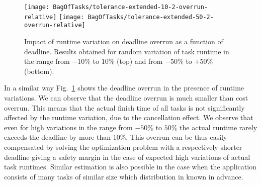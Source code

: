 {  \begin{figure}[tb]
     \centering
     \texttt{[image: BagOfTasks/tolerance-extended-10-2-overrun-relative]}  
     \texttt{[image: BagOfTasks/tolerance-extended-50-2-overrun-relative]}  
 	   \caption{Impact of runtime variation on deadline overrun as a function of deadline. 
 	   Results obtained for random variation of task runtime in the range from $ -10\%$ to $10\%$ (top)
 	   and from $-50\%$ to $+50\%$ (bottom). }
 	   \label{fig:dynamic-time}
  \end{figure} 

  In a similar way Fig.~\ref{fig:dynamic-time} shows the deadline overrun in
  the presence of runtime variations. We can observe that the deadline overrun
  is much smaller than cost overrun. This means that the actual finish time of
  all tasks is not significantly affected by the runtime variation, due to the
  cancellation effect. We observe that even for high variations in the range
  from $-50\%$ to $50\%$ the actual runtime rarely exceeds the deadline by
  more than 10\%. This overrun can be thus easily compensated by solving the
  optimization problem with a respectively shorter deadline giving a safety
  margin in the case of expected high variations of actual task runtimes. Similar
  estimation is also possible in the case when the application consists of many
  tasks of similar size which distribution in known in advance. 
	
	
} %
